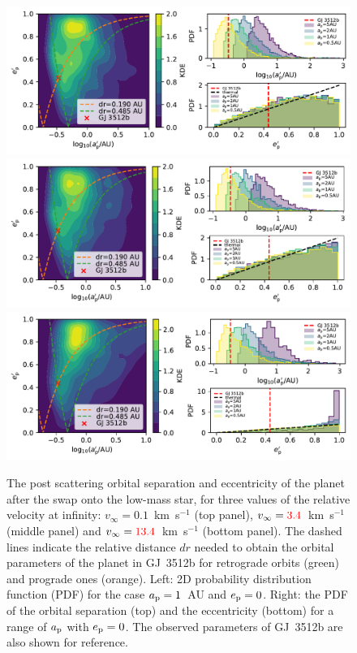 \documentclass[twocolumn]{aastex62}
\begin{document}
\begin{figure}
\includegraphics[width=2\columnwidth]{letter-new-ae-01}\\
\includegraphics[width=2\columnwidth]{letter-new-ae-34}\\
 \includegraphics[width=2\columnwidth]{letter-new-ae-13}
  \caption{The post scattering orbital separation and eccentricity of the planet after the swap onto the low-mass star, for three values of the relative velocity at infinity: $v_\infty=0.1$~km~s$^{-1}$ (top panel), $v_\infty={\color{red}3.4}$~km~s$^{-1}$ (middle panel) and $v_\infty={\color{red}13.4}$~km~s$^{-1}$ (bottom panel). 
  The dashed lines indicate the relative distance $dr$ 
  needed to obtain the orbital parameters of the planet in GJ~3512b for retrograde orbits (green) and prograde ones (orange).
  Left: 2D probability distribution function (PDF) for the case $a_{\rm p}=1$~AU and $e_{\rm p}=0$. Right: the PDF of the orbital separation (top) and the eccentricity (bottom) for a range of $a_{\rm p}$ with $e_{\rm p}=0$. The observed parameters of GJ~3512b are also shown for reference. }
 \label{fig:orbits}
\end{figure}
\end{document}
